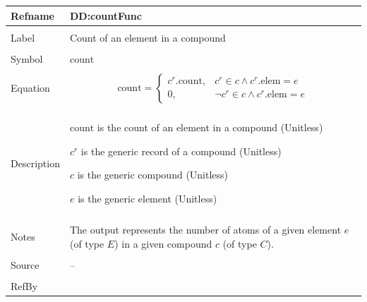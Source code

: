 \documentclass[12pt]{article}
\begin{document}
\begin{minipage}{\textwidth}
\begin{tabular}{>{\raggedright}p{}>{\raggedright\arraybackslash}p{}}
\toprule \textbf{Refname} & \textbf{DD:countFunc}
\label{DD:countFunc}
\\ \midrule \\
Label & Count of an element in a compound
        
\\ \midrule \\
Symbol & $\text{count}$
         
\\ \midrule \\
Equation & \begin{displaymath}
           \text{count}=\begin{cases}
                        {c^{r}}\text{.count}, & {c^{r}}\in{}c\land{}{c^{r}}\text{.elem}=e\\
                        0, & \neg{}{c^{r}}\in{}c\land{}{c^{r}}\text{.elem}=e
                        \end{cases}
           \end{displaymath}
\\ \midrule \\
Description & \begin{symbDescription}
              \item{$\text{count}$ is the count of an element in a compound (Unitless)}
              \item{${c^{r}}$ is the generic record of a compound (Unitless)}
              \item{$c$ is the generic compound (Unitless)}
              \item{$e$ is the generic element (Unitless)}
              \end{symbDescription}
\\ \midrule \\
Notes & The output represents the number of atoms of a given element $e$ (of type $E$) in a given compound $c$ (of type $C$).
        
\\ \midrule \\
Source & --
         
\\ \midrule \\
RefBy & 
\\ \bottomrule
\end{tabular}
\end{minipage}
\end{document}
